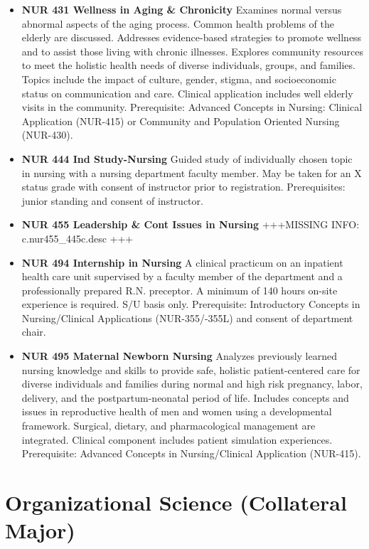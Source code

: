 \documentclass[
  letterpaper,
]{scrbook}
\begin{document}
\begin{itemize}
  (NUR-425).
\item
  \textbf{NUR 431 Wellness in Aging \& Chronicity} Examines normal
  versus abnormal aspects of the aging process. Common health problems
  of the elderly are discussed. Addresses evidence-based strategies to
  promote wellness and to assist those living with chronic illnesses.
  Explores community resources to meet the holistic health needs of
  diverse individuals, groups, and families. Topics include the impact
  of culture, gender, stigma, and socioeconomic status on communication
  and care. Clinical application includes well elderly visits in the
  community. Prerequisite: Advanced Concepts in Nursing: Clinical
  Application (NUR-415) or Community and Population Oriented Nursing
  (NUR-430).
\item
  \textbf{NUR 444 Ind Study-Nursing} Guided study of individually chosen
  topic in nursing with a nursing department faculty member. May be
  taken for an X status grade with consent of instructor prior to
  registration. Prerequisites: junior standing and consent of
  instructor.
\item
  \textbf{NUR 455 Leadership \& Cont Issues in Nursing} +++MISSING INFO:
  c.nur455\_445c.desc +++
\item
  \textbf{NUR 494 Internship in Nursing} A clinical practicum on an
  inpatient health care unit supervised by a faculty member of the
  department and a professionally prepared R.N. preceptor. A minimum of
  140 hours on-site experience is required. S/U basis only.
  Prerequisite: Introductory Concepts in Nursing/Clinical Applications
  (NUR-355/-355L) and consent of department chair.
\item
  \textbf{NUR 495 Maternal Newborn Nursing} Analyzes previously learned
  nursing knowledge and skills to provide safe, holistic
  patient-centered care for diverse individuals and families during
  normal and high risk pregnancy, labor, delivery, and the
  postpartum-neonatal period of life. Includes concepts and issues in
  reproductive health of men and women using a developmental framework.
  Surgical, dietary, and pharmacological management are integrated.
  Clinical component includes patient simulation experiences.
  Prerequisite: Advanced Concepts in Nursing/Clinical Application
  (NUR-415).
\end{itemize}

\section{Organizational Science (Collateral
Major)}\label{sec-organizational-science}
\end{document}
